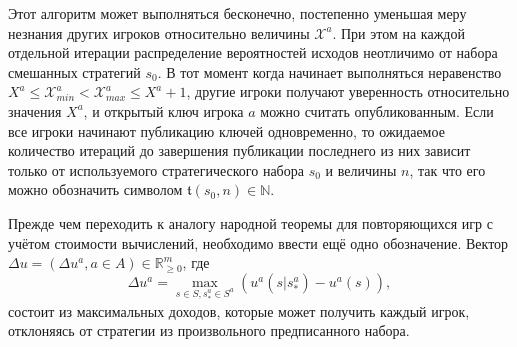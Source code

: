 Этот алгоритм может выполняться бесконечно, постепенно уменьшая меру незнания других игроков относительно величины $\mathcal{X}^a$. При этом на каждой отдельной итерации распределение вероятностей исходов неотличимо от набора смешанных стратегий $s_0$. В тот момент когда начинает выполняться неравенство $X^a \le \mathcal{X}^a_{min} < \mathcal{X}^a_{max} \le X^a + 1$, другие игроки получают уверенность относительно значения $X^a$, и открытый ключ игрока $a$ можно считать опубликованным. Если все игроки начинают публикацию ключей одновременно, то ожидаемое количество итераций до завершения публикации последнего из них зависит только от используемого стратегического набора $s_0$ и величины $n$, так что его можно обозначить символом $\mathfrak{t}(s_0, n) \in \mathbb{N}$.

Прежде чем переходить к аналогу народной теоремы для повторяющихся игр с учётом стоимости вычислений, необходимо ввести ещё одно обозначение. Вектор $\Delta u = (\Delta u^a, a \in A) \in \mathbb{R}_{\ge 0}^m$, где
\begin{equation*}
	\Delta u^a = \max_{s \in S, s^a_* \in S^a} (u^a(s | s^a_*) - u^a(s)),
\end{equation*}
состоит из максимальных доходов, которые может получить каждый игрок, отклоняясь от стратегии из произвольного предписанного набора.

